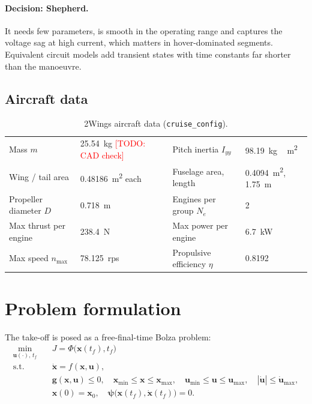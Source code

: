 \documentclass[11pt,a4paper]{article}
\newcommand{\todo}[1]{\textcolor{red}{[TODO: #1]}}
\newcommand{\code}[1]{\texttt{\small #1}}
\begin{document}
\paragraph{Decision: Shepherd.} It needs few parameters, is smooth in the operating range and
captures the voltage sag at high current, which matters in hover-dominated segments. Equivalent
circuit models add transient states with time constants far shorter than the manoeuvre.

\subsection{Aircraft data}
\begin{table}[h]
\centering\small
\begin{tabular}{@{}llll@{}}
\toprule
Mass $m$ & \SI{25.54}{kg} \todo{CAD check} & Pitch inertia $I_{yy}$ & \SI{98.19}{kg\,m^2} \\
Wing / tail area & \SI{0.48186}{m^2} each & Fuselage area, length & \SI{0.4094}{m^2}, \SI{1.75}{m} \\
Propeller diameter $D$ & \SI{0.718}{m} & Engines per group $N_e$ & 2 \\
Max thrust per engine & \SI{238.4}{N} & Max power per engine & \SI{6.7}{kW} \\
Max speed $n_\text{max}$ & \SI{78.125}{rps} & Propulsive efficiency $\eta$ & 0.8192 \\
\bottomrule
\end{tabular}
\caption{2Wings aircraft data (\code{cruise\_config}).}
\end{table}

\section{Problem formulation}\label{sec:formulation}

The take-off is posed as a free-final-time Bolza problem:
\begin{equation}
\begin{aligned}
\min_{\mathbf{u}(\cdot),\, t_f} \quad & J = \Phi\big(\mathbf{x}(t_f), t_f\big) \\
\text{s.t.} \quad & \dot{\mathbf{x}} = f(\mathbf{x},\mathbf{u}), \\
& \mathbf{g}(\mathbf{x},\mathbf{u}) \le 0, \quad
  \mathbf{x}_\text{min} \le \mathbf{x} \le \mathbf{x}_\text{max}, \quad
  \mathbf{u}_\text{min} \le \mathbf{u} \le \mathbf{u}_\text{max}, \quad |\dot{\mathbf{u}}| \le \dot{\mathbf{u}}_\text{max}, \\
& \mathbf{x}(0) = \mathbf{x}_0, \quad \boldsymbol\psi\big(\mathbf{x}(t_f), \dot{\mathbf{x}}(t_f)\big) = 0 .
\end{aligned}
\end{equation}
\end{document}
